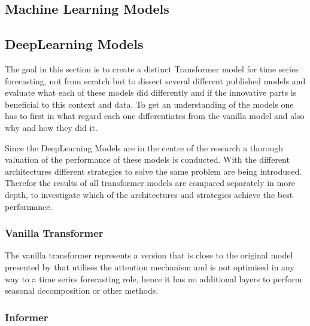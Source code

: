 \documentclass{article}
\begin{document}
\subsection{Machine Learning Models}


\subsection{DeepLearning Models}

The goal in this section is to create a distinct Transformer model for time series forecasting, not from scratch but to dissect several different published models and evaluate what each of these models did differently and if the innovative parts is beneficial to this context and data. To get an understanding of the models one has to first in what regard each one differentiates from the vanilla model and also why and how they did it. \par 
Since the DeepLearning Models are in the centre of the research a thorough valuation of the performance of these models is conducted. With the different architectures different strategies to solve the same problem are being introduced. Therefor the results of all transformer models are compared separately in more depth, to investigate which of the architectures and strategies achieve the best performance. 

\subsubsection{Vanilla Transformer}

The vanilla transformer represents a version that is close to the original model presented by \cite{vanilla-transformer} that utilises the attention mechanism and is not optimised in any way to a time series forecasting role, hence it has no additional layers to perform seasonal decomposition or other methods.

\subsubsection{Informer}
\end{document}
